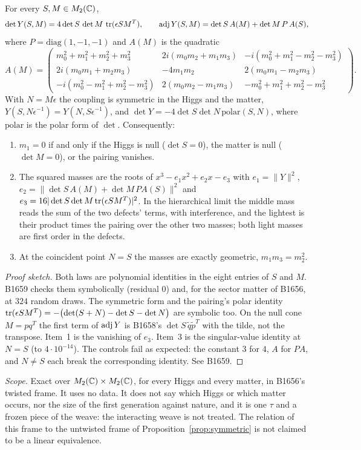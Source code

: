 \begin{theorem}\label{thm:joint}
For every $S,M\in M_2(\mathbb{C})$,
\[
  \det Y(S,M)=4\det S\,\det M\,\operatorname{tr}(\epsilon SM^{T}),\qquad
  \operatorname{adj} Y(S,M)=\det S\,A(M)+\det M\,P\,A(S),
\]
where $P=\mathrm{diag}(1,-1,-1)$ and $A(M)$ is the quadratic
\[
  A(M)=\begin{pmatrix}
  m_0^2+m_1^2+m_2^2+m_3^2 & 2i(m_0m_2+m_1m_3) & -i(m_0^2+m_1^2-m_2^2-m_3^2)\\
  2i(m_0m_1+m_2m_3) & -4m_1m_2 & 2(m_0m_1-m_2m_3)\\
  -i(m_0^2-m_1^2+m_2^2-m_3^2) & 2(m_0m_2-m_1m_3) & -m_0^2+m_1^2+m_2^2-m_3^2
  \end{pmatrix}.
\]
With $N=M\epsilon$ the coupling is symmetric in the Higgs and the matter, $Y(S,N\epsilon^{-1})=Y(N,S\epsilon^{-1})$,
and $\det Y=-4\det S\det N\,\mathrm{polar}(S,N)$, where $\mathrm{polar}$ is the polar form of $\det$. Consequently:
\begin{enumerate}
\item $m_1=0$ if and only if the Higgs is null ($\det S=0$), the matter is null ($\det M=0$), or the pairing vanishes.
\item The squared masses are the roots of $x^3-e_1x^2+e_2x-e_3$ with $e_1=\|Y\|^2$,
  $e_2=\|\det S\,A(M)+\det M\,PA(S)\|^2$ and $e_3=16|\det S\det M\operatorname{tr}(\epsilon SM^T)|^2$. In the hierarchical limit the middle
  mass reads the sum of the two defects' terms, with interference, and the lightest is their product times the pairing over the
  other two masses; both light masses are first order in the defects.
\item At the coincident point $N=S$ the masses are exactly geometric, $m_1m_3=m_2^2$.
\end{enumerate}
\end{theorem}
\begin{proof}[Proof sketch]
Both laws are polynomial identities in the eight entries of $S$ and $M$. B1659 checks them symbolically (residual $0$)
and, for the sector matter of B1656, at $324$ random draws. The symmetric form and the pairing's polar identity
$\operatorname{tr}(\epsilon SM^T)=-\bigl(\det(S+N)-\det S-\det N\bigr)$ are symbolic too. On the null cone $M=pq^T$ the first term of
$\operatorname{adj} Y$ is B1658's $\det S\,\tilde q\tilde p^T$ with the tilde, not the transpose. Item~1 is the vanishing of $e_3$.
Item~3 is the singular-value identity at $N=S$ (to $4\cdot10^{-14}$). The controls fail as expected: the constant $3$ for
$4$, $A$ for $PA$, and $N\neq S$ each break the corresponding identity. See B1659.
\end{proof}
\noindent\emph{Scope.} Exact over $M_2(\mathbb{C})\times M_2(\mathbb{C})$, for every Higgs and every matter, in B1656's twisted frame. It
uses no data. It does not say which Higgs or which matter occurs, nor the size of the first generation against nature, and
it is one $\tau$ and a frozen piece of the weave: the interacting weave is not treated. The relation of this frame to the
untwisted frame of Proposition~\ref{prop:symmetric} is not claimed to be a linear equivalence.

